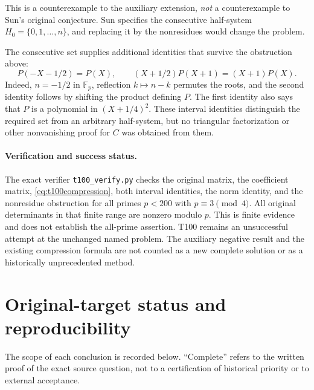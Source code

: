 \documentclass[11pt,a4paper]{article}
\theoremstyle{definition}
\theoremstyle{remark}
\begin{document}
This is a counterexample to the auxiliary extension, \emph{not} a
counterexample to Sun's original conjecture. Sun specifies the
consecutive half-system $H_0=\{0,1,\ldots,n\}$, and replacing it by
the nonresidues would change the problem.

The consecutive set supplies additional identities that survive the
obstruction above:
\begin{equation}\label{eq:t100interval}
 P(-X-1/2)=P(X),\qquad
 (X+1/2)P(X+1)=(X+1)P(X).
\end{equation}
Indeed, $n=-1/2$ in $\mathbb F_p$, reflection $k\mapsto n-k$ permutes
the roots, and the second identity follows by shifting the product
defining $P$. The first identity also says that $P$ is a polynomial in
$(X+1/4)^2$. These interval identities distinguish the required set
from an arbitrary half-system, but no triangular factorization or other
nonvanishing proof for $C$ was obtained from them.

\paragraph{Verification and success status.}
The exact verifier \texttt{t100\_verify.py} checks the original matrix,
the coefficient matrix, \eqref{eq:t100compression}, both interval
identities, the norm identity, and the nonresidue obstruction for all
primes $p<200$ with $p\equiv3\pmod4$. All original determinants in
that finite range are nonzero modulo $p$. This is finite evidence and
does not establish the all-prime assertion. T100 remains an unsuccessful
attempt at the unchanged named problem. The auxiliary negative result
and the existing compression formula are not counted as a new complete
solution or as a historically unprecedented method.
\clearpage
\section*{Original-target status and reproducibility}

The scope of each conclusion is recorded below. ``Complete'' refers to
the written proof of the exact source question, not to a certification
of historical priority or to external acceptance.
\end{document}
